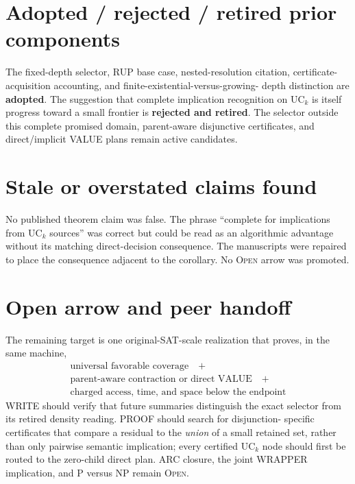 \documentclass[11pt]{article}
\begin{document}
\section{Adopted / rejected / retired prior components}
The fixed-depth selector, RUP base case, nested-resolution citation,
certificate-acquisition accounting, and finite-existential-versus-growing-
depth distinction are \textbf{adopted}.  The suggestion that complete
implication recognition on $\mathrm{UC}_k$ is itself progress toward a small
frontier is \textbf{rejected and retired}.  The selector outside this
complete promised domain, parent-aware disjunctive certificates, and
direct/implicit VALUE plans remain active candidates.

\section{Stale or overstated claims found}
No published theorem claim was false.  The phrase ``complete for
implications from $\mathrm{UC}_k$ sources'' was correct but could be read as
an algorithmic advantage without its matching direct-decision consequence.
The manuscripts were repaired to place the consequence adjacent to the
corollary.  No \textsc{Open} arrow was promoted.

\section{Open arrow and peer handoff}
The remaining target is one original-SAT-scale realization that proves, in
the same machine,
\[
 \begin{gathered}
 \text{universal favorable coverage}\quad +\\
 \text{parent-aware contraction or direct VALUE}\quad +\\
 \text{charged access, time, and space below the endpoint}
 \end{gathered}
\]
WRITE should verify that future summaries distinguish the exact selector
from its retired density reading.  PROOF should search for disjunction-
specific certificates that compare a residual to the \emph{union} of a
small retained set, rather than only pairwise semantic implication; every
certified $\mathrm{UC}_k$ node should first be routed to the zero-child direct
plan.  ARC closure, the joint WRAPPER implication, and P versus NP remain
\textsc{Open}.



\end{document}
